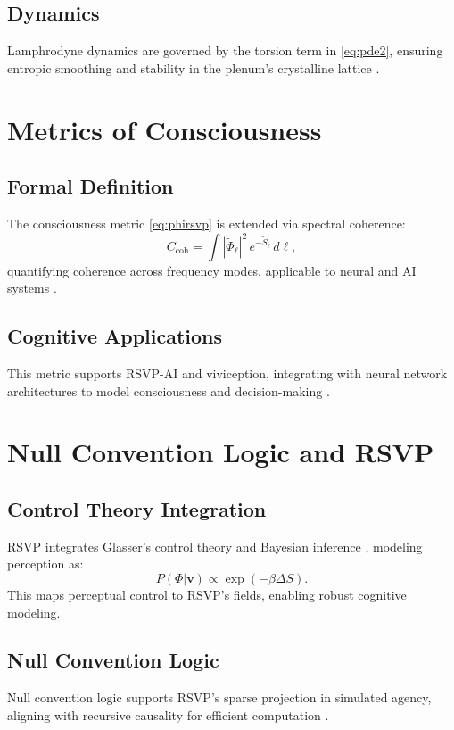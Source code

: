 \documentclass[12pt]{report}
\newcommand{\PhiRSVP}{\Phi}
\newcommand{\vRSVP}{\mathbf{v}}
\newcommand{\SRSVP}{S}
\begin{document}
\section{Dynamics}
Lamphrodyne dynamics are governed by the torsion term in \eqref{eq:pde2}, ensuring entropic smoothing and stability in the plenum’s crystalline lattice \citep{RSVPMeta2025}.

\chapter{Metrics of Consciousness}
\label{app:M}
\section{Formal Definition}
The consciousness metric \eqref{eq:phirsvp} is extended via spectral coherence:
\begin{equation}
C_{\text{coh}} = \int |\tilde{\PhiRSVP}_\ell|^2 \, e^{-\tilde{\SRSVP}_\ell} \, d\ell,
\end{equation}
quantifying coherence across frequency modes, applicable to neural and AI systems \citep{Tononi2016}.

\section{Cognitive Applications}
This metric supports RSVP-AI and viviception, integrating with neural network architectures to model consciousness and decision-making \citep{RSVPMeta2025}.

\chapter{Null Convention Logic and RSVP}
\label{app:N}
\section{Control Theory Integration}
RSVP integrates Glasser’s control theory \citep{Glasser1985} and Bayesian inference \citep{Friston2010}, modeling perception as:
\begin{equation}
P(\PhiRSVP | \vRSVP) \propto \exp\left(-\beta \Delta \SRSVP\right).
\end{equation}
This maps perceptual control to RSVP’s fields, enabling robust cognitive modeling.

\section{Null Convention Logic}
Null convention logic \citep{Fant1998} supports RSVP’s sparse projection in simulated agency, aligning with recursive causality for efficient computation \citep{RSVPMeta2025}.
\end{document}
